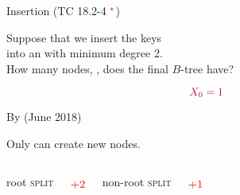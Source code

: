 
\begin{frame}{}
  \begin{exampleblock}{Insertion (TC 18.2-4$\;^{\textcolor{red}{\star}}$)}
    \begin{center}
      Suppose that we insert the keys   \\[5pt]
      into an  with minimum degree 2. \\[6pt]
      How many nodes, , does the final $B$-tree have?
    \end{center}
  \end{exampleblock}

  \pause
  \vspace{0.60cm}
  \[
    \textcolor{purple}{X_{0} = 1}
  \]
\end{frame}

\begin{frame}{}
  \begin{center}
    By  (June 2018) \\[20pt]
    \href{https://maxmute.com/TC18.2-4.html}{}
  \end{center}
\end{frame}

\begin{frame}{}
  \begin{center}
    Only  can create new nodes.
  \end{center}

  \pause
  \begin{columns}

      \begin{center}
        root \textsc{split}
      \end{center}
      \[
        \textcolor{red}{+2}
      \]
    \pause

      \begin{center}
        non-root \textsc{split}
      \end{center}
      \[
        \textcolor{red}{+1}
      \]
  \end{columns}
\end{frame}

